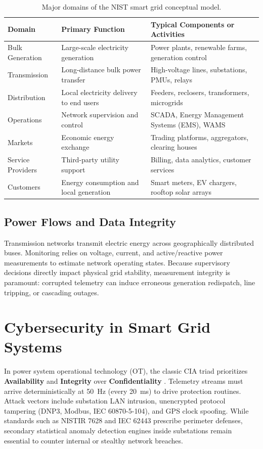 \documentclass[11pt,a4paper]{report}
\begin{document}
\begin{table}[htbp]
\centering
\caption{Major domains of the NIST smart grid conceptual model.}
\label{tab:smartgrid_domains}
\renewcommand{\arraystretch}{1.2}
\small
\begin{tabular}{|p{3.0cm}|p{5.0cm}|p{6.0cm}|}
\hline
\textbf{Domain} & \textbf{Primary Function} & \textbf{Typical Components or Activities} \\
\hline
Bulk Generation & Large-scale electricity generation & Power plants, renewable farms, generation control \\
\hline
Transmission & Long-distance bulk power transfer & High-voltage lines, substations, PMUs, relays \\
\hline
Distribution & Local electricity delivery to end users & Feeders, reclosers, transformers, microgrids \\
\hline
Operations & Network supervision and control & SCADA, Energy Management Systems (EMS), WAMS \\
\hline
Markets & Economic energy exchange & Trading platforms, aggregators, clearing houses \\
\hline
Service Providers & Third-party utility support & Billing, data analytics, customer services \\
\hline
Customers & Energy consumption and local generation & Smart meters, EV chargers, rooftop solar arrays \\
\hline
\end{tabular}
\end{table}

\subsection{Power Flows and Data Integrity}
Transmission networks transmit electric energy across geographically distributed buses. Monitoring
relies on voltage, current, and active/reactive power measurements to estimate network operating
states. Because supervisory decisions directly impact physical grid stability, measurement
integrity is paramount: corrupted telemetry can induce erroneous generation redispatch, line
tripping, or cascading outages.

\section{Cybersecurity in Smart Grid Systems}
In power system operational technology (OT), the classic CIA triad prioritizes \textbf{Availability}
and \textbf{Integrity} over \textbf{Confidentiality} \cite{nist80082}. Telemetry streams must arrive
deterministically at 50~Hz (every 20~ms) to drive protection routines. Attack vectors include
substation LAN intrusion, unencrypted protocol tampering (DNP3, Modbus, IEC 60870-5-104), and
GPS clock spoofing. While standards such as NISTIR 7628 \cite{nist7628,nist7628r1} and IEC 62443
prescribe perimeter defenses, secondary statistical anomaly detection engines inside substations
remain essential to counter internal or stealthy network breaches.
\end{document}
